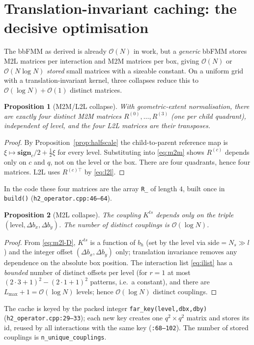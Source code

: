 \documentclass[11pt,a4paper]{article}
\newcommand{\Order}{\mathcal{O}}
\newcommand{\code}[1]{\texttt{#1}}
\newtheorem{proposition}{Proposition}
\theoremstyle{definition}
\theoremstyle{remark}
\begin{document}
\section{Translation-invariant caching: the decisive optimisation}
\label{sec:cache}

The bbFMM as derived is already $\Order(N)$ in work, but a \emph{generic} bbFMM
stores M2L matrices per interaction and M2M matrices per box, giving $\Order(N)$
or $\Order(N\log N)$ \emph{stored} small matrices with a sizeable constant. On a
uniform grid with a translation-invariant kernel, three collapses reduce this to
$\Order(\log N)+\Order(1)$ distinct matrices.

\begin{proposition}[M2M/L2L collapse]
\label{prop:m2m-cache}
With geometric-extent normalisation, there are exactly four distinct M2M matrices
$R^{(0)},\dots,R^{(3)}$ (one per child quadrant), independent of level, and the
four L2L matrices are their transposes.
\end{proposition}
\begin{proof}
By Proposition~\ref{prop:halfscale} the child-to-parent reference map is
$\xi\mapsto \mathbf{sign}_c/2+\tfrac12\xi$ for every level. Substituting into
\eqref{eq:m2m} shows $R^{(c)}$ depends only on $c$ and $q$, not on the level or
the box. There are four quadrants, hence four matrices. L2L uses $R^{(c)\top}$
by \eqref{eq:l2l}.
\end{proof}
In the code these four matrices are the array \code{R\_} of length $4$, built once
in \code{build()} (\code{h2\_operator.cpp:46--64}).

\begin{proposition}[M2L collapse]
\label{prop:m2l-cache}
The coupling $K^{ts}$ depends only on the triple $(\text{level},\Delta b_x,
\Delta b_y)$. The number of distinct couplings is $\Order(\log N)$.
\end{proposition}
\begin{proof}
From \eqref{eq:m2l-D}, $K^{ts}$ is a function of $b_h$ (set by the level via
$\text{side}=N_s\gg l$) and the integer offset $(\Delta b_x,\Delta b_y)$ only;
translation invariance removes any dependence on the absolute box position. The
interaction list \eqref{eq:ilist} has a \emph{bounded} number of distinct
offsets per level (for $r=1$ at most $(2\cdot3+1)^2-(2\cdot1+1)^2$ patterns,
i.e.\ a constant), and there are $L_{\max}+1=\Order(\log N)$ levels; hence
$\Order(\log N)$ distinct couplings.
\end{proof}
The cache is keyed by the packed integer \code{far\_key(level,dbx,dby)}
(\code{h2\_operator.cpp:29--33}); each new key creates one $q^2\times q^2$ matrix
and stores its id, reused by all interactions with the same key
(\code{:68--102}). The number of stored couplings is \code{n\_unique\_couplings}.
\end{document}
